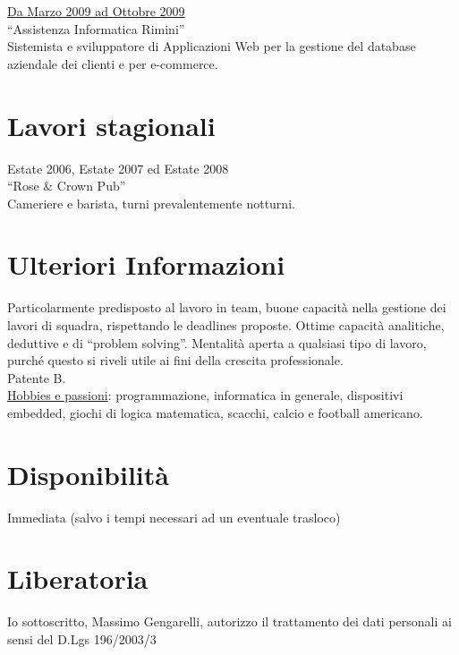 \documentclass[margin]{res}
\begin{document}
\begin{resume}
\vspace{2mm}

\underline{Da Marzo 2009 ad Ottobre 2009} \\
``Assistenza Informatica Rimini'' \\
Sistemista e sviluppatore di Applicazioni Web per la gestione del database
aziendale dei clienti e per e-commerce.

\section{Lavori stagionali}
Estate 2006, Estate 2007 ed Estate 2008 \\
``Rose \& Crown Pub'' \\
Cameriere e barista, turni prevalentemente notturni.

\section{Ulteriori Informazioni}
Particolarmente predisposto al lavoro in team, buone capacit\`a nella gestione dei lavori di
squadra, rispettando le deadlines proposte. Ottime capacit\`a analitiche, deduttive e di ``problem
solving''. Mentalit\`a aperta a qualsiasi tipo di lavoro, purch\'e questo si riveli utile ai fini
della crescita professionale. \\
Patente B. \\
\underline{Hobbies e passioni}: programmazione, informatica in generale, dispositivi embedded, 
giochi di logica matematica, scacchi, calcio e football americano.

\section{Disponibilit\`a}
Immediata (salvo i tempi necessari ad un eventuale trasloco)

\section{Liberatoria}
Io sottoscritto, Massimo Gengarelli, autorizzo il trattamento dei dati personali ai sensi
del D.Lgs 196/2003/3

\end{resume} 
\end{document}
